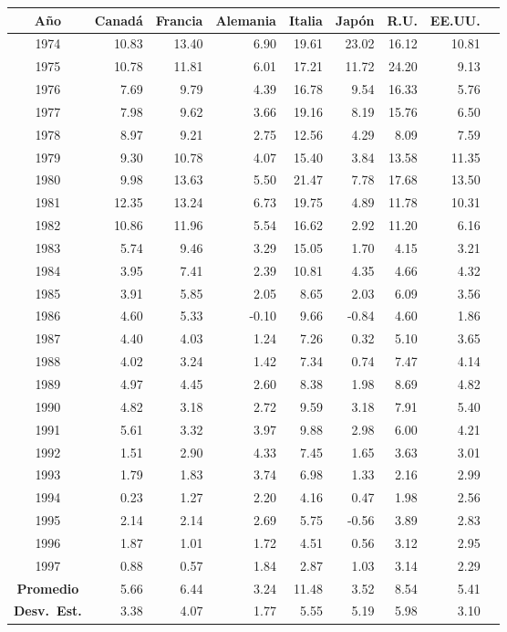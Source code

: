 \documentclass[12pt, letterpaper]{article}
\theoremstyle{remark}
\begin{document}
\begin{datebox}
\small
\centering
\captionsetup{type=table}
\vspace{4pt}
\begin{tabular}{crrrrrrrr}
\toprule
\textbf{A\~no} & \textbf{Canad\'a} & \textbf{Francia} & \textbf{Alemania} & \textbf{Italia} & \textbf{Jap\'on} & \textbf{R.U.} & \textbf{EE.UU.} \\
\midrule
1974 & 10.83 & 13.40 & 6.90 & 19.61 & 23.02 & 16.12 & 10.81 \\
1975 & 10.78 & 11.81 & 6.01 & 17.21 & 11.72 & 24.20 & 9.13 \\
1976 &  7.69 &  9.79 & 4.39 & 16.78 &  9.54 & 16.33 & 5.76 \\
1977 &  7.98 &  9.62 & 3.66 & 19.16 &  8.19 & 15.76 & 6.50 \\
1978 &  8.97 &  9.21 & 2.75 & 12.56 &  4.29 &  8.09 & 7.59 \\
1979 &  9.30 & 10.78 & 4.07 & 15.40 &  3.84 & 13.58 & 11.35 \\
1980 &  9.98 & 13.63 & 5.50 & 21.47 &  7.78 & 17.68 & 13.50 \\
1981 & 12.35 & 13.24 & 6.73 & 19.75 &  4.89 & 11.78 & 10.31 \\
1982 & 10.86 & 11.96 & 5.54 & 16.62 &  2.92 & 11.20 &  6.16 \\
1983 &  5.74 &  9.46 & 3.29 & 15.05 &  1.70 &  4.15 &  3.21 \\
1984 &  3.95 &  7.41 & 2.39 & 10.81 &  4.35 &  4.66 &  4.32 \\
1985 &  3.91 &  5.85 & 2.05 &  8.65 &  2.03 &  6.09 &  3.56 \\
1986 &  4.60 &  5.33 &-0.10 &  9.66 & -0.84 &  4.60 &  1.86 \\
1987 &  4.40 &  4.03 & 1.24 &  7.26 &  0.32 &  5.10 &  3.65 \\
1988 &  4.02 &  3.24 & 1.42 &  7.34 &  0.74 &  7.47 &  4.14 \\
1989 &  4.97 &  4.45 & 2.60 &  8.38 &  1.98 &  8.69 &  4.82 \\
1990 &  4.82 &  3.18 & 2.72 &  9.59 &  3.18 &  7.91 &  5.40 \\
1991 &  5.61 &  3.32 & 3.97 &  9.88 &  2.98 &  6.00 &  4.21 \\
1992 &  1.51 &  2.90 & 4.33 &  7.45 &  1.65 &  3.63 &  3.01 \\
1993 &  1.79 &  1.83 & 3.74 &  6.98 &  1.33 &  2.16 &  2.99 \\
1994 &  0.23 &  1.27 & 2.20 &  4.16 &  0.47 &  1.98 &  2.56 \\
1995 &  2.14 &  2.14 & 2.69 &  5.75 & -0.56 &  3.89 &  2.83 \\
1996 &  1.87 &  1.01 & 1.72 &  4.51 &  0.56 &  3.12 &  2.95 \\
1997 &  0.88 &  0.57 & 1.84 &  2.87 &  1.03 &  3.14 &  2.29 \\
\midrule
\textbf{Promedio} & 5.66 & 6.44 & 3.24 & 11.48 & 3.52 & 8.54 & 5.41 \\
\textbf{Desv.\ Est.} & 3.38 & 4.07 & 1.77 & 5.55 & 5.19 & 5.98 & 3.10 \\
\bottomrule
\end{tabular}
\end{datebox}
\end{document}
